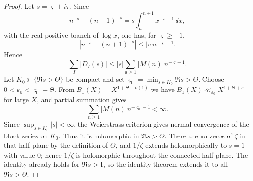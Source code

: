 \documentclass[11pt,reqno]{amsart}
\numberwithin{equation}{section}
\theoremstyle{plain}
\theoremstyle{definition}
\theoremstyle{remark}
\newcommand{\eps}{\varepsilon}
\begin{document}
\begin{proof}
Let $s=\varsigma+i\tau$.  Since
\begin{equation}
 n^{-s}-(n+1)^{-s}
 =s\int_n^{n+1}x^{-s-1}\,dx,
\end{equation}
with the real positive branch of $\log x$, one has, for $\varsigma\ge-1$,
\begin{equation}
 |n^{-s}-(n+1)^{-s}|\le |s|n^{-\varsigma-1}.
\end{equation}
Hence
\begin{equation}
 \sum_I|D_I(s)|
 \le |s|\sum_{n\ge1}|M(n)|n^{-\varsigma-1}.
\end{equation}
Let $K_0\Subset\{\Re s>\Theta\}$ be compact and set
$\varsigma_0=\min_{s\in K_0}\Re s>\Theta$.  Choose
$0<\eps_0<\varsigma_0-\Theta$.  From
$B_1(X)=X^{1+\Theta+o(1)}$ we have
$B_1(X)\ll_{\eps_0}X^{1+\Theta+\eps_0}$ for large $X$, and partial
summation gives
\begin{equation}
 \sum_{n\ge1}|M(n)|n^{-\varsigma_0-1}<\infty.
\end{equation}
Since $\sup_{s\in K_0}|s|<\infty$, the Weierstrass criterion gives normal
convergence of the block series on $K_0$.  Thus it is holomorphic in
$\Re s>\Theta$.  There are no zeros of $\zeta$ in that half-plane by the
definition of $\Theta$, and $1/\zeta$ extends holomorphically to $s=1$ with
value $0$; hence $1/\zeta$ is holomorphic throughout the connected
half-plane.  The identity already holds for $\Re s>1$, so the
identity theorem extends it to all $\Re s>\Theta$.


\end{proof}
\end{document}
